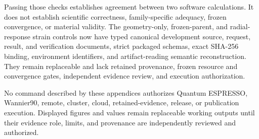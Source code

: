 Passing those checks establishes agreement between two software calculations. It does
not establish scientific correctness, family-specific adequacy, frozen convergence, or
material validity. The geometry-only, frozen-parent, and radial-response strain controls
now have typed canonical development source, request, result, and verification documents,
strict packaged schemas, exact SHA-256 binding, environment identifiers, and
artifact-reading semantic reconstruction. They remain replaceable and lack retained
provenance, frozen resource and convergence gates, independent evidence review, and
execution authorization.

\begin{prospective}
No command described by these appendices authorizes Quantum ESPRESSO, Wannier90, remote,
cluster, cloud, retained-evidence, release, or publication execution. Displayed figures
and values remain replaceable working outputs until their evidence role, limits, and
provenance are independently reviewed and authorized.
\end{prospective}
